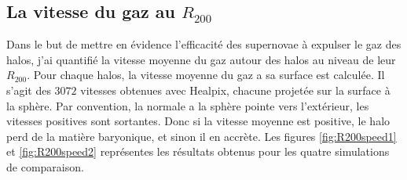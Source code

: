 \subsection{La vitesse du gaz au $R_{200}$}

Dans le but de mettre en évidence l'efficacité des supernovae à expulser le gaz des halos, j'ai quantifié la vitesse moyenne du gaz autour des halos au niveau de leur $R_{200}$.
Pour chaque halos, la vitesse moyenne du gaz a sa surface est calculée.
Il s'agit des $3072$ vitesses obtenues avec Healpix, chacune projetée sur la surface à la sphère.
Par convention, la normale a la sphère pointe vers l'extérieur, les vitesses positives sont sortantes.
Donc si la vitesse moyenne est positive, le halo perd de la matière baryonique, et sinon il en accrète.
Les figures \ref{fig:R200speed1} et \ref{fig:R200speed2} représentes les résultats obtenus pour les quatre simulations de comparaison.

